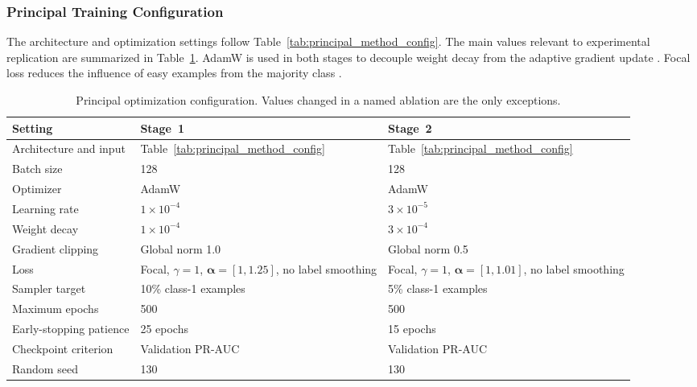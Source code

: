\documentclass[11pt,fleqn]{report}
\begin{document}
\subsubsection{Principal Training Configuration}
\label{subsubsec:principal_training_config}

The architecture and optimization settings follow
Table~\ref{tab:principal_method_config}. The main values relevant to
experimental replication are summarized in
Table~\ref{tab:experimental_training_config}. AdamW is used in both stages to
decouple weight decay from the adaptive gradient update
\cite{Loshchilov2019AdamW}. Focal loss reduces the influence of easy examples
from the majority class \cite{Lin2017FocalLoss}.

\begin{table}[H]
    \centering
    \caption{Principal optimization configuration. Values changed in a named
    ablation are the only exceptions.}
    \label{tab:experimental_training_config}
    \begin{tabular}{@{}p{3.0cm}p{4.6cm}p{5.7cm}@{}}
        \toprule
        Setting & Stage~1 & Stage~2 \\
        \midrule
        Architecture and input & Table~\ref{tab:principal_method_config} &
        Table~\ref{tab:principal_method_config} \\
        Batch size & 128 & 128 \\
        Optimizer & AdamW & AdamW \\
        Learning rate & $1\times10^{-4}$ & $3\times10^{-5}$ \\
        Weight decay & $1\times10^{-4}$ & $3\times10^{-4}$ \\
        Gradient clipping & Global norm 1.0 & Global norm 0.5 \\
        Loss & Focal, $\gamma=1$, $\boldsymbol{\alpha}=[1,1.25]$, no label
        smoothing & Focal, $\gamma=1$, $\boldsymbol{\alpha}=[1,1.01]$, no label
        smoothing \\
        Sampler target & 10\% class-1 examples & 5\% class-1 examples \\
        Maximum epochs & 500 & 500 \\
        Early-stopping patience & 25 epochs & 15 epochs \\
        Checkpoint criterion & Validation PR-AUC & Validation PR-AUC \\
        Random seed & 130 & 130 \\
        \bottomrule
    \end{tabular}
\end{table}
\end{document}
